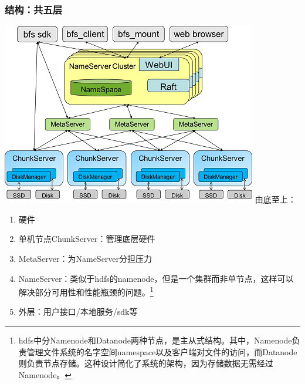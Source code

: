 \documentclass{ctexart}
\begin{document}
\subsubsection{结构：共五层}
\includegraphics[width=\textwidth]{bfs.jpg}
由底至上：
\begin{enumerate}
	\item 硬件
	\item 单机节点ChunkServer：管理底层硬件
	\item MetaServer：为NameServer分担压力
	\item NameServer：类似于hdfs的namenode，但是一个集群而非单节点，这样可以解决部分可用性和性能瓶颈的问题。\footnote{hdfs中分Namenode和Datanode两种节点，是主从式结构。其中，Namenode负责管理文件系统的名字空间namespace以及客户端对文件的访问，而Datanode则负责节点存储。这种设计简化了系统的架构，因为存储数据无需经过Namenode。}
	\item 外层：用户接口/本地服务/sdk等
\end{enumerate}
\end{document}
